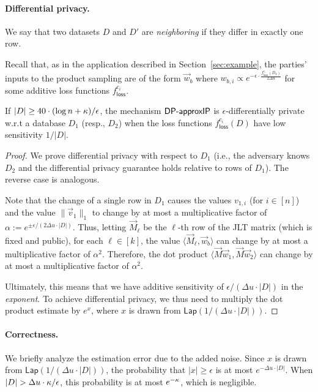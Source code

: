 \paragraph{Differential privacy.}
We say that two datasets $D$ and $D'$ are \emph{neighboring} if they
differ in exactly one row.  

Recall that, as in the application described in
Section~\ref{sec:example}, the parties' inputs to the product sampling
are of the form $\vec{w}_b$ where ${w}_{b,i} \propto e^{-\epsilon \cdot
\frac{f^{c_i}_{\mathsf{loss}}(D_b)}{2 \Delta u}}$ for some additive loss functions
$f^{c_i}_\mathsf{loss}$. 


\begin{theorem}
If $|D| \ge 40 \cdot (\log n + \kappa)/\epsilon$, the mechanism
$\mathsf{DP}\mbox{-}\mathsf{approxIP}$ is $\epsilon$-differentially private w.r.t a database $D_1$
(resp., $D_2$) when the loss functions $f^{c_i}_{\mathsf{loss}}(D)$ have
low sensitivity $1/|D|$.  
\end{theorem}

\begin{proof}
We prove differential privacy with respect to $D_1$ (i.e., the adversary
knows $D_2$ and the differential privacy guarantee holds relative to
rows of $D_1$). The reverse case is analogous.

Note that the change of a single row in $D_1$ causes the values ${v}_{1,i}$ (for $i \in [n]$) and the value $\|\vec{v}_1\|_1$ to change by at most a  
multiplicative factor of $\alpha := e^{\pm \epsilon / (2
\Delta u \cdot |D|)}$.
Thus, letting $\vec{M}_\ell$ be the $\ell$-th row of the JLT matrix (which is
fixed and public), for each $\ell \in [k]$, the value $\langle
\vec{M}_\ell,  \vec{w}_b \rangle$ can change by at most a multiplicative
factor of $\alpha^2$. 
%
Therefore, the dot product $\langle \vec{M} \vec{w}_1, \vec{M}
\vec{w}_2\rangle$ can change by at most a multiplicative factor of
$\alpha^2$. 

Ultimately, this means that we have additive sensitivity of $\epsilon/
(\Delta u \cdot |D|)$ in the \emph{exponent}.  To achieve differential
privacy, we thus need to multiply the dot product estimate by $e^x$,
where $x$ is drawn from $\mathsf{Lap}(1/ (\Delta u \cdot |D|))$.  
\end{proof}

\paragraph{Correctness.}
We briefly analyze the estimation error due to the added noise.  Since
$x$ is drawn from $\mathsf{Lap}(1/(\Delta u \cdot |D|))$, the
probability that $|x| \geq \epsilon$ is at most $e^{-\Delta u \cdot
|D|}$. When $|D| > \Delta u \cdot \kappa /\epsilon$, this probability
is at most $e^{-\kappa}$, which is negligible. 

